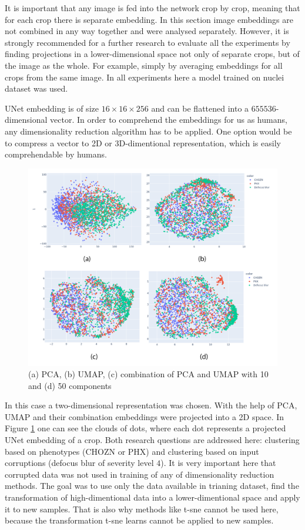 It is important that any image is fed into the network crop by crop, meaning that for each crop there is separate embedding. In this section image embeddings are not combined in any way together and were analysed separately. However, it is strongly recommended for a further research to evaluate all the experiments by finding projections in a lower-dimensional space not only of separate crops, but of the image as the whole. For example, simply by averaging embeddings for all crops from the same image. In all experiments here a model trained on nuclei dataset was used.

UNet embedding is of size $16 \times 16 \times 256$ and can be flattened into a $655536$-dimensional vector. In order to comprehend the embeddings for us as humans, any dimensionality reduction algorithm has to be applied. One option would be to compress a vector to 2D or 3D-dimentional representation, which is easily comprehendable by humans.
\begin{figure}[htb]
	\includegraphics[width=\linewidth]{bilder/unet-embeddings/umap-pca-embeddings.png}
	\caption{(a) PCA, (b) UMAP, (c) combination of PCA and UMAP with 10 and (d) 50 components}\label{fig:umap-pca-embeddings}
\end{figure}

In this case a two-dimensional representation was chosen. With the help of PCA, UMAP and their combination embeddings were projected into a 2D space. In Figure \ref{fig:umap-pca-embeddings} one can see the clouds of dots, where each dot represents a projected UNet embedding of a crop. Both research questions are addressed here: clustering based on phenotypes (CHOZN or PHX) and clustering based on input corruptions (defocus blur of severity level $4$). It is very important here that corrupted data was not used in training of any of dimensionality reduction methods. The goal was to use only the data available in trianing dataset, find the transformation of high-dimentional data into a lower-dimentional space and apply it to new samples. That is also why methods like t-sne \cite{t-sne} cannot be used here, because the transformation t-sne learns cannot be applied to new samples.

